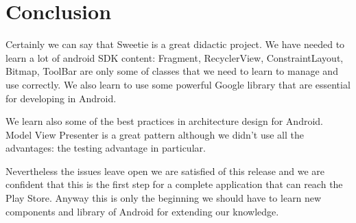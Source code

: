 
\section{Conclusion}
\label{sec:conclusion} 
Certainly we can say that Sweetie is a great didactic project. We have needed to learn a lot of android SDK content: Fragment, RecyclerView, ConstraintLayout, Bitmap, ToolBar are only some of classes that we need to learn to manage and use correctly. We also learn to use some powerful Google library that are essential for developing in Android.

We learn also some of the best practices in architecture design for Android. Model View Presenter is a great pattern although we didn't use all the advantages: the testing advantage in particular.

Nevertheless the issues leave open we are satisfied of this release and we are confident that this is the first step for a complete application that can reach the Play Store. Anyway this is only the beginning we should have to learn new components and library of Android for extending our knowledge.